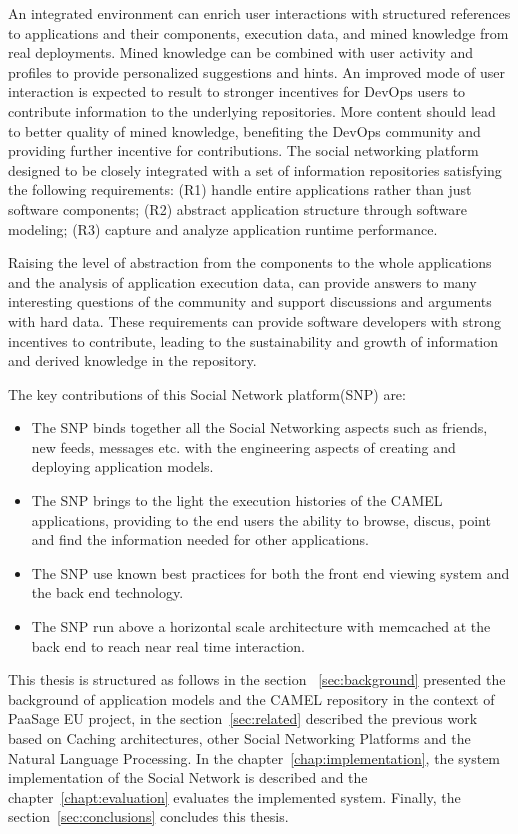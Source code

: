 An integrated environment can enrich user interactions with structured references to applications and their components, execution data, and mined knowledge from real deployments. Mined knowledge can be combined with user activity and profiles to provide personalized suggestions and hints.  An improved mode of user interaction is expected to result to stronger incentives for DevOps users to contribute information to the underlying repositories. More content should lead to better quality of mined knowledge, benefiting the DevOps community and providing further incentive for contributions.  The social networking platform designed to be closely integrated with a set of information repositories satisfying the following requirements: 
(R1) handle entire applications rather than just software components; (R2) abstract application structure through software modeling; (R3) capture and analyze application runtime performance. 

Raising the level of abstraction from the components to the whole applications and the analysis of application execution data, can provide answers to many interesting questions of the community and support discussions and arguments with hard data. 
These requirements can provide software developers with strong incentives to contribute, leading to the sustainability and growth of information and derived knowledge in the repository.

The key contributions of this Social Network platform(SNP) are:
\begin{itemize}
\item The SNP binds together all the Social Networking aspects such as friends, new feeds, messages etc. with the engineering aspects of creating and deploying application models.
\item The SNP brings to the light the execution histories of the CAMEL applications, providing to the end users the ability to browse, discus, point and find the information needed for other applications.
\item The SNP use known best practices for both the front end viewing system and the back end technology.
\item The SNP run above a horizontal scale architecture with memcached at the back end to reach near real time interaction. 
\end{itemize}

This thesis is structured as follows in the section ~\ref{sec:background} presented the background of application models and the CAMEL repository in the context of PaaSage EU project, in the section~\ref{sec:related} described the previous work based on Caching architectures, other Social Networking Platforms and the Natural Language Processing. In the chapter~\ref{chap:implementation}, the system implementation of the Social Network is described and the chapter~\ref{chapt:evaluation} evaluates the implemented system. Finally, the section~\ref{sec:conclusions} concludes this thesis.

